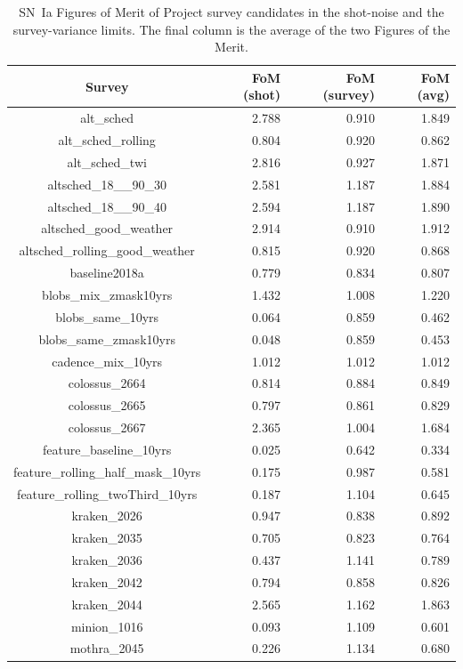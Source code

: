 \documentclass[a4paper,10pt]{article}
\begin{document}
\begin{table}
\caption{SN~Ia Figures of Merit of Project survey candidates
in  the shot-noise and the survey-variance limits.  The final column is the average
of the two Figures of the Merit.\label{table:ref}}
\centering
\begin{tabular}{|c|rrr|}
\hline
Survey & FoM (shot) & FoM (survey) & FoM (avg)\\
\hline
alt\_sched  & 2.788 & 0.910 & 1.849  \\
alt\_sched\_rolling  & 0.804 & 0.920 & 0.862  \\
alt\_sched\_twi  & 2.816 & 0.927 & 1.871  \\
altsched\_18\_\_90\_30  & 2.581 & 1.187 & 1.884  \\
altsched\_18\_\_90\_40  & 2.594 & 1.187 & 1.890  \\
altsched\_good\_weather  & 2.914 & 0.910 & 1.912  \\
altsched\_rolling\_good\_weather  & 0.815 & 0.920 & 0.868  \\
baseline2018a  & 0.779 & 0.834 & 0.807  \\
blobs\_mix\_zmask10yrs  & 1.432 & 1.008 & 1.220  \\
blobs\_same\_10yrs  & 0.064 & 0.859 & 0.462  \\
blobs\_same\_zmask10yrs  & 0.048 & 0.859 & 0.453  \\
cadence\_mix\_10yrs  & 1.012 & 1.012 & 1.012  \\
colossus\_2664  & 0.814 & 0.884 & 0.849  \\
colossus\_2665  & 0.797 & 0.861 & 0.829  \\
colossus\_2667  & 2.365 & 1.004 & 1.684  \\
feature\_baseline\_10yrs  & 0.025 & 0.642 & 0.334  \\
feature\_rolling\_half\_mask\_10yrs  & 0.175 & 0.987 & 0.581  \\
feature\_rolling\_twoThird\_10yrs  & 0.187 & 1.104 & 0.645  \\
kraken\_2026  & 0.947 & 0.838 & 0.892  \\
kraken\_2035  & 0.705 & 0.823 & 0.764  \\
kraken\_2036  & 0.437 & 1.141 & 0.789  \\
kraken\_2042  & 0.794 & 0.858 & 0.826  \\
kraken\_2044  & 2.565 & 1.162 & 1.863  \\
minion\_1016  & 0.093 & 1.109 & 0.601  \\
mothra\_2045  & 0.226 & 1.134 & 0.680  \\

\end{tabular}
\end{table}
\end{document}
